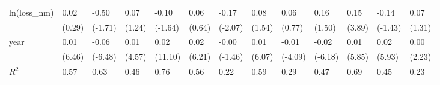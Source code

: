 \begin{tabular}{p{1.5cm} p{1.7cm} p{1.7cm} p{1.7cm}  p{1.7cm} p{1.7cm} p{1.7cm} p{1.7cm} p{1.7cm}  p{1.7cm} p{1.7cm} p{1.7cm} p{1.7cm} }
\hline
ln(loss\_nm)     &     0.02         &    -0.50         &     0.07         &    -0.10         &     0.06         &    -0.17\sym{*}  &     0.08         &     0.06         &     0.16         &     0.15\sym{***}&    -0.14         &     0.07         \\
                &   (0.29)         &  (-1.71)         &   (1.24)         &  (-1.64)         &   (0.64)         &  (-2.07)         &   (1.54)         &   (0.77)         &   (1.50)         &   (3.89)         &  (-1.43)         &   (1.31)         \\
year            &     0.01\sym{***}&    -0.06\sym{***}&     0.01\sym{***}&     0.02\sym{***}&     0.02\sym{***}&    -0.00         &     0.01\sym{***}&    -0.01\sym{***}&    -0.02\sym{***}&     0.01\sym{***}&     0.02\sym{***}&     0.00\sym{*}  \\
                &   (6.46)         &  (-6.48)         &   (4.57)         &  (11.10)         &   (6.21)         &  (-1.46)         &   (6.07)         &  (-4.09)         &  (-6.18)         &   (5.85)         &   (5.93)         &   (2.23)         \\
\hline
\(R^{2}\)       &     0.57         &     0.63         &     0.46         &     0.76         &     0.56         &     0.22         &     0.59         &     0.29         &     0.47         &     0.69         &     0.45         &     0.23         \\
\end{tabular}
